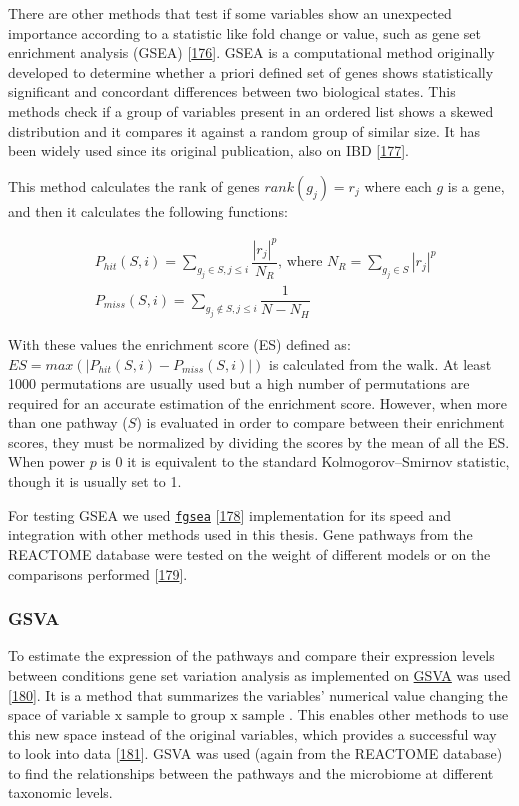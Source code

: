 \documentclass[
  12pt,
  a4paper,
  twoside,
  openright]{book}
\begin{document}
There are other methods that test if some variables show an unexpected importance according to a statistic like fold change or value, such as gene set enrichment analysis (GSEA) {[}\protect\hyperlink{ref-subramanian2005}{176}{]}.
GSEA is a computational method originally developed to determine whether a priori defined set of genes shows statistically significant and concordant differences between two biological states.
This methods check if a group of variables present in an ordered list shows a skewed distribution and it compares it against a random group of similar size.
It has been widely used since its original publication, also on IBD {[}\protect\hyperlink{ref-protiva2016}{177}{]}.

This method calculates the rank of genes \(rank(g_j)=r_j\) where each \(g\) is a gene, and then it calculates the following functions:

\[
\begin{aligned}
& P_{hit}(S, i) = \sum_{g_j \in S, j \leq i}\dfrac{|r_j|^p}{N_R} \text{, where } N_R = \sum_{g_j \in S}|r_j|^p \\
& P_{miss}(S, i) = \sum_{g_j \not \in S, j \leq i}\dfrac{1}{N - N_H}
\end{aligned}
\]

With these values the enrichment score (ES) defined as: \(ES=max(|P_{hit}(S, i)-P_{miss}(S, i)\vert)\) is calculated from the walk.
At least 1000 permutations are usually used but a high number of permutations are required for an accurate estimation of the enrichment score.
However, when more than one pathway (\(S\)) is evaluated in order to compare between their enrichment scores, they must be normalized by dividing the scores by the mean of all the ES.
When power \(p\) is 0 it is equivalent to the standard Kolmogorov--Smirnov statistic, though it is usually set to 1.

For testing GSEA we used \href{https://bioconductor.org/packages/fgsea}{\texttt{fgsea}} {[}\protect\hyperlink{ref-korotkevich2021}{178}{]} implementation for its speed and integration with other methods used in this thesis.
Gene pathways from the REACTOME database were tested on the weight of different models or on the comparisons performed {[}\protect\hyperlink{ref-fabregat2016}{179}{]}.

\hypertarget{gsva}{%
\subsubsection{GSVA}\label{gsva}}

To estimate the expression of the pathways and compare their expression levels between conditions gene set variation analysis as implemented on \href{https://bioconductor.org/packages/GSVA}{GSVA} was used {[}\protect\hyperlink{ref-huxe4nzelmann2013}{180}{]}.
It is a method that summarizes the variables' numerical value changing the space of \(\text{variable x sample}\) to \(\text{group x sample}\) .
This enables other methods to use this new space instead of the original variables, which provides a successful way to look into data {[}\protect\hyperlink{ref-escudero-hernuxe1ndez2021}{181}{]}.
GSVA was used (again from the REACTOME database) to find the relationships between the pathways and the microbiome at different taxonomic levels.
\end{document}
